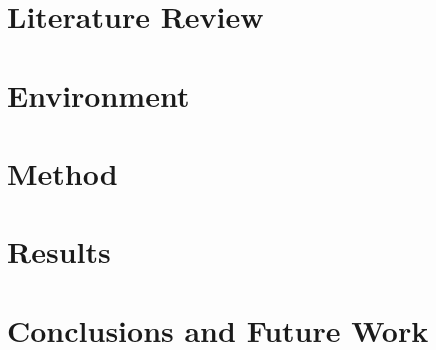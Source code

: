 \documentclass[12pt]{scrreprt}
\begin{document}
\chapter{Literature Review}


\chapter{Environment}


\chapter{Method}


\chapter{Results}


\chapter{Conclusions and Future Work}


\listoffigures
\printbibliography
\end{document}
